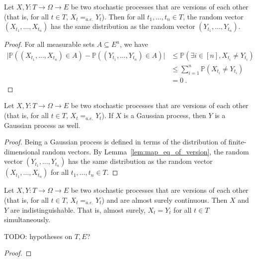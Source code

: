 \begin{lemma}\label{lem:map_eq_of_version}
Let $X, Y : T \to \Omega \to E$ be two stochastic processes that are versions of each other (that is, for all $t \in T$, $X_t =_{a.e.} Y_t$).
Then for all $t_1, \ldots, t_n \in T$, the random vector $(X_{t_1}, \ldots, X_{t_n})$ has the same distribution as the random vector $(Y_{t_1}, \ldots, Y_{t_n})$.
\end{lemma}

\begin{proof}
For all measurable sets $A \subseteq E^n$, we have
\begin{align*}
  \vert \mathbb{P}((X_{t_1}, \ldots, X_{t_n}) \in A) - \mathbb{P}((Y_{t_1}, \ldots, Y_{t_n}) \in A) \vert
  &\le \mathbb{P}(\exists i \in [n], X_{t_i} \ne Y_{t_i})
  \\
  &\le \sum_{i=1}^n \mathbb{P}(X_{t_i} \ne Y_{t_i})
  \\
  &= 0
  \: .
\end{align*}
\end{proof}


\begin{lemma}\label{lem:isGaussianProcess_of_version}
  \leanok
Let $X, Y : T \to \Omega \to E$ be two stochastic processes that are versions of each other (that is, for all $t \in T$, $X_t =_{a.e.} Y_t$).
If $X$ is a Gaussian process, then $Y$ is a Gaussian process as well.
\end{lemma}

\begin{proof}
Being a Gaussian process is defined in terms of the distribution of finite-dimensional random vectors.
By Lemma~\ref{lem:map_eq_of_version}, the random vector $(Y_{t_1}, \ldots, Y_{t_n})$ has the same distribution as the random vector $(X_{t_1}, \ldots, X_{t_n})$ for all $t_1, \ldots, t_n \in T$.
\end{proof}


\begin{lemma}\label{lem:indistinguishable_of_version_of_continuous}
Let $X, Y : T \to \Omega \to E$ be two stochastic processes that are versions of each other (that is, for all $t \in T$, $X_t =_{a.e.} Y_t$) and are almost surely continuous.
Then $X$ and $Y$ are indistinguishable. That is, almost surely, $X_t = Y_t$ for all $t \in T$ simultaneously.

TODO: hypotheses on $T, E$?
\end{lemma}

\begin{proof}

\end{proof}
